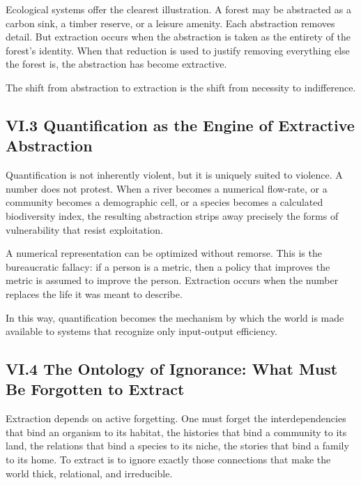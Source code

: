 \documentclass[11pt,letterpaper]{article}
\begin{document}
Ecological systems offer the clearest illustration. A forest may be abstracted as a carbon sink, a timber reserve, or a leisure amenity. Each abstraction removes detail. But extraction occurs when the abstraction is taken as the entirety of the forest’s identity. When that reduction is used to justify removing everything else the forest is, the abstraction has become extractive.

The shift from abstraction to extraction is the shift from necessity to indifference.

\subsection{VI.3 Quantification as the Engine of Extractive Abstraction}

Quantification is not inherently violent, but it is uniquely suited to violence. A number does not protest. When a river becomes a numerical flow-rate, or a community becomes a demographic cell, or a species becomes a calculated biodiversity index, the resulting abstraction strips away precisely the forms of vulnerability that resist exploitation.

A numerical representation can be optimized without remorse. This is the bureaucratic fallacy: if a person is a metric, then a policy that improves the metric is assumed to improve the person. Extraction occurs when the number replaces the life it was meant to describe.

In this way, quantification becomes the mechanism by which the world is made available to systems that recognize only input-output efficiency.

\subsection{VI.4 The Ontology of Ignorance: What Must Be Forgotten to Extract}

Extraction depends on active forgetting. One must forget the interdependencies that bind an organism to its habitat, the histories that bind a community to its land, the relations that bind a species to its niche, the stories that bind a family to its home. To extract is to ignore exactly those connections that make the world thick, relational, and irreducible.
\end{document}
